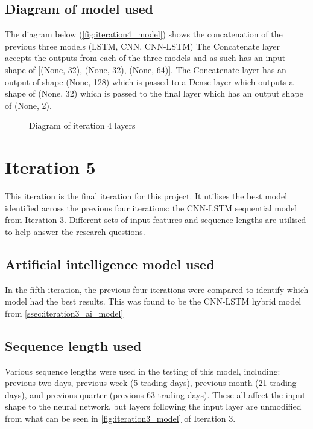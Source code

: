 \subsection{Diagram of model used}
The diagram below (\autoref{fig:iteration4_model}) shows the concatenation of the previous three models (LSTM, CNN, CNN-LSTM)
The Concatenate layer accepts the outputs from each of the three models and as such has an input shape of
{[(None, 32), (None, 32), (None, 64)]}. The Concatenate layer has an output of shape (None, 128) which is passed to a Dense
layer which outputs a shape of (None, 32) which is passed to the final layer which has an output shape of (None, 2).
\begin{figure}[p]
    \centering
    \caption[Diagram of iteration 4 layers]{Diagram of iteration 4 layers}
    \label{fig:iteration4_model}
\end{figure}
\FloatBarrier

\section{Iteration 5}
This iteration is the final iteration for this project. It utilises the best model identified across the
previous four iterations: the CNN-LSTM sequential model from Iteration 3. Different sets of input features
and sequence lengths are utilised to help answer the research questions.

\subsection{Artificial intelligence model used}\label{ssec:iteration5_ai_model}
In the fifth iteration, the previous four iterations were compared to identify which model had the best results.
This was found to be the CNN-LSTM hybrid model from \autoref{ssec:iteration3_ai_model}

\subsection{Sequence length used}
Various sequence lengths were used in the testing of this model, including: previous two days,
previous week (5 trading days), previous month (21 trading days), and previous quarter (previous 63 trading days).
These all affect the input shape to the neural network, but layers following the input layer are unmodified from
what can be seen in \autoref{fig:iteration3_model} of Iteration 3.

